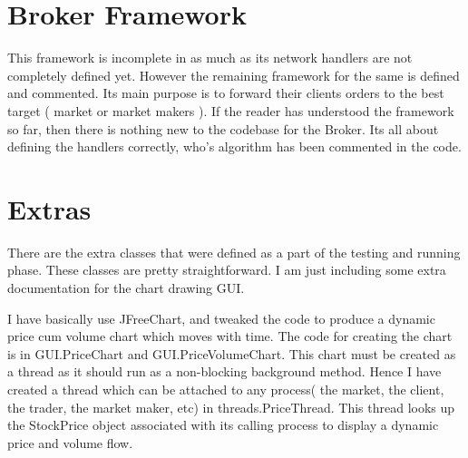 \documentclass{amsart}
\begin{document}
\section{Broker Framework}

This framework is incomplete in as much as its network handlers are not
completely defined yet. However the remaining framework for the same is
defined and commented. Its main purpose is to forward their clients orders to
the best target ( market or market makers ). If the reader has understood the
framework so far, then there is nothing new to the codebase for the Broker.
Its all about defining the handlers correctly, who's algorithm has been
commented in the code.

\section{Extras}

There are the extra classes that were defined as a part of the testing and
running phase. These classes are pretty straightforward. I am just including
some extra documentation for the chart drawing GUI.

I have basically use JFreeChart, and tweaked the code to produce a dynamic
price cum volume chart which moves with time. The code for creating the chart
is in GUI.PriceChart and GUI.PriceVolumeChart. This chart must be created as a
thread as it should run as a non-blocking background method. Hence I have
created a thread which can be attached to any process( the market, the client,
the trader, the market maker, etc) in threads.PriceThread. This thread looks
up the StockPrice object associated with its calling process to display a
dynamic price and volume flow.
\end{document}
